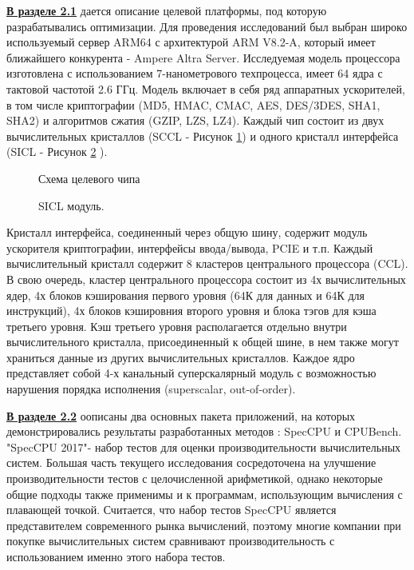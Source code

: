 \underline{\textbf{В разделе 2.1}}
дается описание целевой платформы, под которую разрабатывались
оптимизации. Для проведения исследований был выбран широко используемый сервер
ARM64 с архитектурой ARM V8.2-A, который имеет ближайшего конкурента - Ampere Altra Server. Исследуемая модель процессора изготовлена
с использованием 7-нанометрового техпроцесса, имеет 64 ядра с тактовой частотой
2.6 ГГц. Модель включает в себя ряд аппаратных ускорителей, в том
числе криптографии (MD5, HMAC, CMAC, AES, DES/3DES, SHA1, SHA2) и
алгоритмов сжатия (GZIP, LZS, LZ4).
Каждый чип состоит из двух вычислительных кристаллов (SCCL - Рисунок
\ref{chip1}) и одного кристалл интерфейса (SICL - Рисунок \ref{chip2} ).

\begin{figure}[htbp]
	\centering
	
	\caption{Схема целевого чипа}
	\label{chip1}
\end{figure}
\begin{figure}[htbp]
	\centering
	
	\caption{SICL модуль.}
	\label{chip2}
\end{figure}



Кристалл
интерфейса, соединенный через общую шину, содержит модуль ускорителя
криптографии, интерфейсы ввода/вывода, PCIE и т.п. Каждый вычислительный
кристалл содержит 8 кластеров центрального процессора (CCL). В свою
очередь, кластер центрального процессора состоит из 4х вычислительных ядер,
4х блоков кэширования первого уровня (64К для данных и 64К для инструкций),
4х блоков кэшировния второго уровня и блока тэгов для кэша третьего
уровня. Кэш третьего уровня располагается отдельно внутри вычислительного
кристалла, присоединенный к общей шине, в нем также могут храниться данные
из других вычислительных кристаллов. Каждое ядро представляет собой
4-х канальный суперскалярный модуль с возможностью нарушения порядка
исполнения (superscalar, out-of-order).



\underline{\textbf{В разделе 2.2}} оописаны два основных пакета приложений, на которых демонстрировались результаты разработанных методов : SpecCPU и CPUBench. "SpecCPU 2017"\phantom{ }- набор тестов для оценки производительности вычислительных
систем. Большая часть текущего исследования сосредоточена
на улучшение производительности тестов с целочисленной арифметикой,
однако некоторые общие подходы также применимы и к программам, использующим
вычисления с плавающей точкой. Считается, что набор тестов
SpecCPU является представителем современного рынка вычислений, поэтому
многие компании при покупке вычислительных систем сравнивают производительность
с использованием именно этого набора тестов. 

